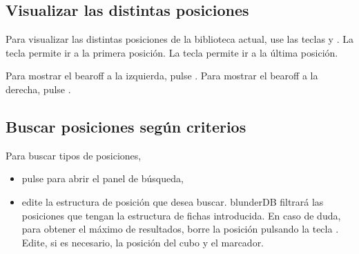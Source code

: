 \documentclass[letterpaper,10pt,spanish]{sphinxmanual}
\begin{document}
\subsection{Visualizar las distintas posiciones}
\label{\detokenize{guide_utilisateur:visualiser-les-differentes-positions}}
\sphinxAtStartPar
Para visualizar las distintas posiciones de la biblioteca actual, use las teclas  y . La tecla  permite ir a la primera posición. La tecla  permite ir a la última posición.

\sphinxAtStartPar
Para mostrar el bearoff a la izquierda, pulse . Para mostrar el bearoff a la derecha, pulse .


\subsection{Buscar posiciones según criterios}
\label{\detokenize{guide_utilisateur:rechercher-des-positions-selon-des-criteres}}
\sphinxAtStartPar
Para buscar tipos de posiciones,
\begin{itemize}
\item {} 
\sphinxAtStartPar
pulse  para abrir el panel de búsqueda,

\item {} 
\sphinxAtStartPar
edite la estructura de posición que desea buscar. blunderDB filtrará las posiciones que tengan  la estructura de fichas introducida. En caso de duda, para obtener el máximo de resultados, borre la posición pulsando la tecla . Edite, si es necesario, la posición del cubo y el marcador.

\end{itemize}
\end{document}
